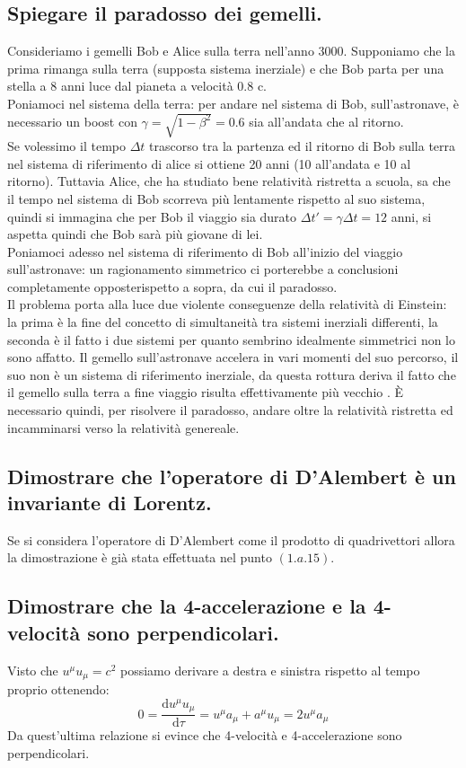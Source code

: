 \subsection[]{ Spiegare il paradosso dei gemelli.} 
Consideriamo i gemelli Bob e Alice sulla terra nell'anno 3000. Supponiamo che la prima rimanga sulla terra (supposta sistema inerziale) e che Bob parta per una stella a 8 anni luce dal pianeta a velocità 0.8 c. \\
Poniamoci nel sistema della terra: per andare nel sistema di Bob, sull'astronave, è necessario un boost con $\gamma = \sqrt{1-\beta^2} = 0.6$ sia all'andata che al ritorno.\\
Se volessimo il tempo $\Delta t$ trascorso tra la partenza ed il ritorno di Bob sulla terra nel sistema di riferimento di alice si ottiene 20 anni (10 all'andata e 10 al ritorno). Tuttavia Alice, che ha studiato bene relatività ristretta a scuola, sa che il tempo nel sistema di Bob scorreva più lentamente rispetto al suo sistema, quindi si immagina che per Bob il viaggio sia durato $\Delta t' = \gamma \Delta t = 12$ anni, si aspetta quindi che Bob sarà più giovane di lei.\\
Poniamoci adesso nel sistema di riferimento di Bob all'inizio del viaggio sull'astronave: un ragionamento simmetrico ci porterebbe a conclusioni completamente opposterispetto a sopra, da cui il paradosso. \\
Il problema porta alla luce due violente conseguenze della relatività di Einstein: la prima è la fine del concetto di simultaneità tra sistemi inerziali differenti, la seconda è il fatto i due sistemi per quanto sembrino idealmente simmetrici non lo sono affatto. Il gemello sull'astronave accelera in vari momenti del suo percorso, il suo non è un sistema di riferimento inerziale, da questa rottura deriva il fatto che il gemello sulla terra a fine viaggio risulta effettivamente più vecchio . È necessario quindi, per risolvere il paradosso, andare oltre la relatività ristretta ed incamminarsi verso la relatività genereale. 

\subsection[]{Dimostrare che l'operatore di D'Alembert è un invariante di Lorentz.} 
Se si considera l'operatore di D'Alembert come il prodotto di quadrivettori allora la dimostrazione è già stata effettuata nel punto $(1.a.15)$.
\subsection[]{Dimostrare che la 4-accelerazione e la 4-velocità sono perpendicolari.} 
Visto che $u^{\mu}u_{\mu} = c^{2}$ possiamo derivare a destra e sinistra rispetto al tempo proprio ottenendo:
\[
	0 = \frac{\mbox{d} u^{\mu}u_{\mu}}{\mbox{d} \tau} = u^{\mu}a_{\mu} + a^{\mu}u_{\mu} = 2 u^{\mu}a_{\mu}
\] 
Da quest'ultima relazione si evince che 4-velocità e 4-accelerazione sono perpendicolari.
